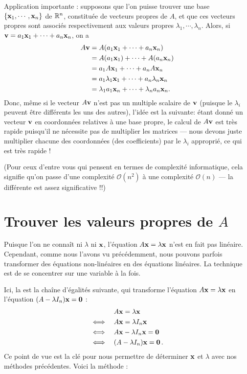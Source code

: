 
Application importante :  
supposons que l'on puisse trouver une base $\{ \mathbf{x}_1,\cdots,\mathbf{x}_n\}$ de $\mathbb{R}^n$, constituée de
vecteurs propres de $A$, et que ces vecteurs propres sont associ\'es respectivement aux valeurs propres $\lambda_1,\cdots, \lambda_n$.
Alors, si $\mathbf{v} = a_1 \mathbf{x}_1 + \cdots + a_n \mathbf{x}_n$,
on a
\begin{align*}
A\mathbf{v} &= A(a_1 \mathbf{x}_1 + \cdots + a_n \mathbf{x}_n)\\
 &= A(a_1 \mathbf{x}_1) + \cdots + A( a_n \mathbf{x}_n)\\
&= a_1 A\mathbf{x}_1 + \cdots + a_n A\mathbf{x}_n\\
&= a_1\lambda_1 \mathbf{x}_1 + \cdots + a_n\lambda_n \mathbf{x}_n\\
&= \lambda_1a_1\mathbf{x}_n + \cdots + \lambda_na_n\mathbf{x}_n.
\end{align*}
Donc, même si le vecteur $A\mathbf{v}$ n'est pas un multiple scalaire de $\mathbf{v}$ (puisque le
$\lambda_i$ peuvent être différents les uns des autres), l'idée est la suivante: étant donné un vecteur $\mathbf{v}$ en coordonnées relatives à une base propre, le calcul de
$A\mathbf{v}$ est très rapide puisqu'il ne nécessite pas de multiplier les matrices --- nous devons juste
multiplier chacune des coordonnées (des coefficients) par le $\lambda_i$ approprié, ce qui est très rapide !

(Pour ceux d'entre vous qui pensent en termes de complexité informatique, cela signifie qu'on
passe d'une complexité $\mathcal O(n^2)$ à une complexité $\mathcal O(n)$ --- la différente est assez significative !\!!)


\section{Trouver les valeurs propres de $A$}

Puisque l'on ne connaît ni $\lambda$ ni $\mathbf{x}$, l'équation $A\mathbf{x} = \lambda \mathbf{x}$ n'est
en fait pas linéaire.  Cependant, comme nous l'avons vu précédemment, nous pouvons parfois 
transformer des équations non-linéaires en des équations linéaires. La technique est de se concentrer sur une variable à la fois.

Ici, la  est la chaîne d'égalités suivante, qui
transforme l'équation $A\mathbf{x} = \lambda \mathbf{x}$ en l'équation $( A- \lambda I_n) \mathbf{x} = \mathbf{0}$ :
\begin{align*}
& A\mathbf{x} = \lambda \mathbf{x} \\
\iff\quad & A\mathbf{x} = \lambda I_n \mathbf{x}\\
\iff\quad & A\mathbf{x} - \lambda I_n \mathbf{x} =\mathbf{0}  \\
\iff\quad & (A-\lambda I_n )\mathbf{x}=\mathbf{0}\,.  
\end{align*}
Ce point de vue est la clé pour nous permettre de déterminer $\mathbf{x}$ et $\lambda$ avec
nos méthodes précédentes. Voici la méthode :

